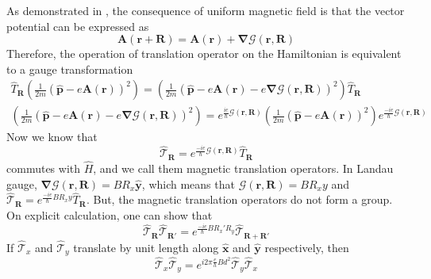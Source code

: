 As demonstrated in \cite{jain2007composite,kohmoto1985topological}, the consequence of uniform magnetic field is that the vector potential can be expressed as
\begin{equation*}
 \mathbf{A}(\mathbf{r} + \mathbf{R}) = \mathbf{A}(\mathbf{r}) + \bm{\nabla}\mathcal{G}(\mathbf{r}, \mathbf{R})
\end{equation*}
Therefore, the operation of translation operator on the Hamiltonian is equivalent to a gauge transformation
\begin{gather}
 \hat{T}_{\mathbf{R}}\left(\frac{1}{2m}(\hat{\mathbf{p}} - e\mathbf{A}(\mathbf{r}))^2\right) = \left(\frac{1}{2m}(\hat{\mathbf{p}} - e\mathbf{A}(\mathbf{r}) - e\bm{\nabla}\mathcal{G}(\mathbf{r}, \mathbf{R}))^2\right)\hat{T}_{\mathbf{R}} \\
 \label{chap_6:magneticgaugetransform}\left(\frac{1}{2m}(\hat{\mathbf{p}} - e\mathbf{A}(\mathbf{r}) - e\bm{\nabla}\mathcal{G}(\mathbf{r}, \mathbf{R}))^2\right) = e^{\frac{ie}{\hbar}\mathcal{G}(\mathbf{r}, \mathbf{R})}\left(\frac{1}{2m}(\hat{\mathbf{p}} - e\mathbf{A}(\mathbf{r}))^2\right)e^{\frac{-ie}{\hbar}\mathcal{G}(\mathbf{r}, \mathbf{R})}
\end{gather}
Now we know that
\begin{equation}
 \hat{\mathcal{T}}_{\mathbf{R}} = e^{\frac{-ie}{\hbar}\mathcal{G}(\mathbf{r}, \mathbf{R})}\hat{T}_{\mathbf{R}}
\end{equation} commutes with $\hat{H}$, and we call them magnetic translation operators.
In Landau gauge, $\bm{\nabla}\mathcal{G}(\mathbf{r}, \mathbf{R}) = BR_{x}\hat{\mathbf{y}}$, which means that $\mathcal{G}(\mathbf{r}, \mathbf{R}) = BR_{x}y$
and $\hat{\mathcal{T}}_{\mathbf{R}} = e^{\frac{-ie}{\hbar}BR_{x}y}\hat{T}_{\mathbf{R}}$.
But, the magnetic translation operators do not form a group. On explicit calculation, one can show that
\begin{equation*}
 \hat{\mathcal{T}}_{\mathbf{R}}\hat{\mathcal{T}}_{\mathbf{R}'} = e^{\frac{-ie}{\hbar}BR_{x}'R_{y}}\hat{\mathcal{T}}_{\mathbf{R} + \mathbf{R}'}
\end{equation*} If $\hat{\mathcal{T}}_{x}$ and $\hat{\mathcal{T}}_{y}$ translate by unit length along $\hat{\mathbf{x}}$ and $\hat{\mathbf{y}}$ respectively, then
\begin{equation*}
 \hat{\mathcal{T}}_{x}\hat{\mathcal{T}}_{y} = e^{i2\pi\frac{e}{h}Bd^2}\hat{\mathcal{T}}_{y}\hat{\mathcal{T}}_{x}
\end{equation*}

